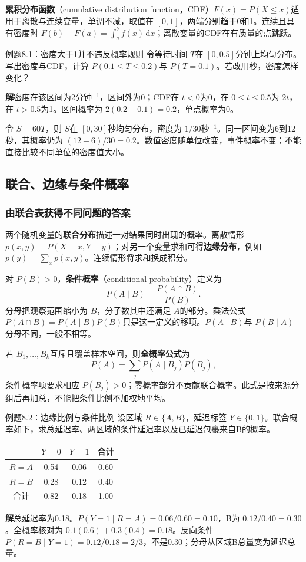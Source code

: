 \documentclass[UTF8,fontset=none,zihao=-4,a4paper]{ctexart}
\newcommand{\term}[1]{\textbf{#1}}
\newcommand{\sol}{\par\noindent\textbf{解}\quad}
\numberwithin{equation}{section}
\numberwithin{figure}{section}
\begin{document}
\term{累积分布函数}（cumulative distribution function，CDF）$F(x)=P(X\le x)$适用于离散与连续变量，单调不减，取值在 $[0,1]$，两端分别趋于0和1。连续且具有密度时 $F(b)-F(a)=\int_a^b f(x)\,\mathrm dx$；离散变量的CDF在有质量的点跳跃。

\begin{infobox}{例题8.1：密度大于1并不违反概率规则}
令等待时间 $T$在 $[0,0.5]$分钟上均匀分布。写出密度与CDF，计算 $P(0.1\le T\le0.2)$与 $P(T=0.1)$。若改用秒，密度怎样变化？
\end{infobox}
\sol 密度在该区间为2分钟$^{-1}$，区间外为0；CDF在 $t<0$为0，在 $0\le t\le0.5$为 $2t$，在 $t>0.5$为1。区间概率为 $2(0.2-0.1)=0.2$，单点概率为0。

令 $S=60T$，则 $S$在 $[0,30]$秒均匀分布，密度为 $1/30$秒$^{-1}$。同一区间变为6到12秒，其概率仍为 $(12-6)/30=0.2$。数值密度随单位改变，事件概率不变；不能直接比较不同单位的密度值大小。

\subsection{联合、边缘与条件概率}
\subsubsection{由联合表获得不同问题的答案}
两个随机变量的\term{联合分布}描述一对结果同时出现的概率。离散情形 $p(x,y)=P(X=x,Y=y)$；对另一个变量求和可得\term{边缘分布}，例如 $p(y)=\sum_xp(x,y)$。连续情形将求和换成积分。

对 $P(B)>0$，\term{条件概率}（conditional probability）定义为
\begin{equation}\label{eq:conditional}
 P(A\mid B)=\frac{P(A\cap B)}{P(B)}.
\end{equation}
分母把观察范围缩小为 $B$，分子数其中还满足 $A$的部分。乘法公式 $P(A\cap B)=P(A\mid B)P(B)$只是这一定义的移项。$P(A\mid B)$与 $P(B\mid A)$分母不同，一般不相等。

若 $B_1,\ldots,B_k$互斥且覆盖样本空间，则\term{全概率公式}为
\[
 P(A)=\sum_jP(A\mid B_j)P(B_j),
\]
条件概率项要求相应 $P(B_j)>0$；零概率部分不贡献联合概率。此式是按来源分组后再加总，不能把条件比例不加权地平均。

\begin{infobox}{例题8.2：边缘比例与条件比例}
设区域 $R\in\{A,B\}$，延迟标签 $Y\in\{0,1\}$。联合概率如下，求总延迟率、两区域的条件延迟率以及已延迟包裹来自B的概率。
\begin{center}
\begin{tabular}{c c c c}
\toprule
 & $Y=0$ & $Y=1$ & 合计\\\midrule
$R=A$ & 0.54 & 0.06 & 0.60\\
$R=B$ & 0.28 & 0.12 & 0.40\\\midrule
合计 & 0.82 & 0.18 & 1.00\\\bottomrule
\end{tabular}
\end{center}
\end{infobox}
\sol 总延迟率为0.18。$P(Y=1\mid R=A)=0.06/0.60=0.10$，B为 $0.12/0.40=0.30$。全概率核对为 $0.1(0.6)+0.3(0.4)=0.18$。反向条件 $P(R=B\mid Y=1)=0.12/0.18=2/3$，不是0.30；分母从区域B总量变为延迟总量。
\end{document}
